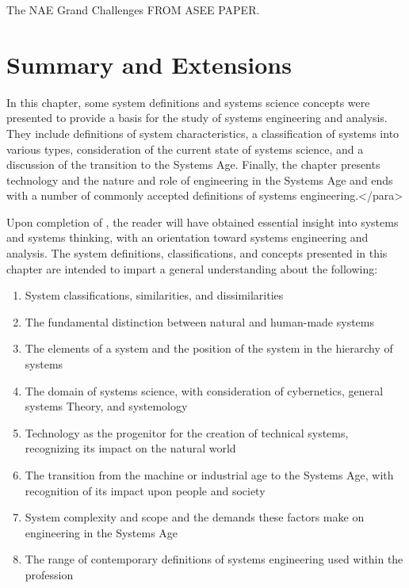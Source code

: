 The NAE Grand Challenges FROM ASEE PAPER.


\section{Summary and Extensions}

In this chapter, some system definitions and systems science concepts were presented to provide a basis for the study of systems engineering and analysis. They include definitions of system characteristics, a classification of systems into various types, consideration of the current state of systems science, and a discussion of the transition to the Systems Age. Finally, the chapter presents technology and the nature and role of engineering in the Systems Age and ends with a number of commonly accepted definitions of systems engineering.</para>

Upon completion of , the reader will have obtained essential insight into systems and systems thinking, with an orientation toward systems engineering and analysis. The system definitions, classifications, and concepts presented in this chapter are intended to impart a general understanding about the following:

\begin{enumerate}
\item System classifications, similarities, and dissimilarities
\item The fundamental distinction between natural and human-made systems
\item The elements of a system and the position of the system in the hierarchy of systems
\item The domain of systems science, with consideration of cybernetics, general systems Theory, and systemology
\item Technology as the progenitor for the creation of technical systems, recognizing its impact on the natural world
\item The transition from the machine or industrial age to the Systems Age, with recognition of its impact upon people and society
\item System complexity and scope and the demands these factors make on engineering in the Systems Age
\item The range of contemporary definitions of systems engineering used within the profession
\end{enumerate}

